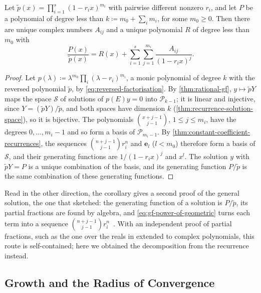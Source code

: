 \begin{corollary}
\label{cor:complex-partial-fractions}
Let $\tilde p(x)=\prod_{i=1}^s(1-r_ix)^{m_i}$ with pairwise different nonzero $r_i$, and let $P$ be a polynomial of degree less than $k\coloneqq m_0+\sum_im_i$, for some $m_0\ge0$. Then there are unique complex numbers $A_{ij}$ and a unique polynomial $R$ of degree less than $m_0$ with
\[
\frac{P(x)}{\tilde p(x)}=R(x)+\sum_{i=1}^s\sum_{j=1}^{m_i}\frac{A_{ij}}{(1-r_ix)^j} .
\]
\end{corollary}

\begin{proof}
Let $p(\lambda)\coloneqq\lambda^{m_0}\prod_i(\lambda-r_i)^{m_i}$, a monic polynomial of degree $k$ with the reversed polynomial $\tilde p$, by \eqref{eq:reversed-factorisation}. By \cref{thm:rational-gf}, $y\mapsto\tilde pY$ maps the space $\mathcal S$ of solutions of $p(E)y=0$ into $\mathcal P_{k-1}$; it is linear and injective, since $Y=(\tilde pY)/\tilde p$, and both spaces have dimension $k$ (\cref{thm:recurrence-solution-space}), so it is bijective. The polynomials $\binom{x+j-1}{j-1}$, $1\le j\le m_i$, have the degrees $0,\ldots,m_i-1$ and so form a basis of $\mathcal P_{m_i-1}$. By \cref{thm:constant-coefficient-recurrences}, the sequences $\binom{n+j-1}{j-1}r_i^n$ and $\mathbf e_l$ ($l<m_0$) therefore form a basis of $\mathcal S$, and their generating functions are $1/(1-r_ix)^j$ and $x^l$. The solution $y$ with $\tilde pY=P$ is a unique combination of the basis, and its generating function $P/\tilde p$ is the same combination of these generating functions.
\end{proof}

Read in the other direction, the corollary gives a second proof of the general solution, the one that  sketched: the generating function of a solution is $P/\tilde p$, its partial fractions are found by algebra, and \eqref{eq:gf-power-of-geometric} turns each term into a sequence $\binom{n+j-1}{j-1}r_i^n$~\cite[Sect.~7.3]{graham1994concrete}. With an independent proof of partial fractions, such as the one over the reals in  extended to complex polynomials, this route is self-contained; here we obtained the decomposition from the recurrence instead.

\subsection{Growth and the Radius of Convergence}

